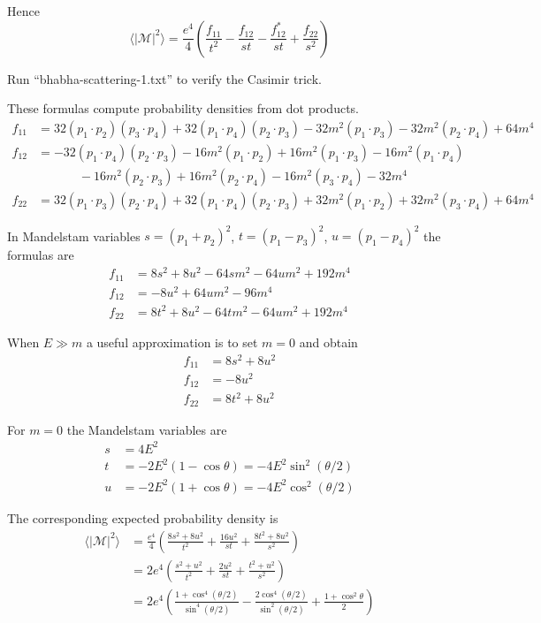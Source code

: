 \documentclass[12pt]{article}
\begin{document}
\noindent
Hence
\begin{equation*}
\langle|\mathcal{M}|^2\rangle
=
\frac{e^4}{4}
\left(
\frac{f_{11}}{t^2} - \frac{f_{12}}{st} -
\frac{f_{12}^*}{st} + \frac{f_{22}}{s^2}
\right)
\end{equation*}

\noindent
Run ``bhabha-scattering-1.txt'' to verify the Casimir trick.

\newpage
\noindent
These formulas compute probability densities from dot products.
\begin{align*}
f_{11}&=
32(p_1\cdot p_2)(p_3\cdot p_4)+32(p_1\cdot p_4)(p_2\cdot p_3)
-32 m^2(p_1\cdot p_3)-32 m^2(p_2\cdot p_4)+64 m^4
\\
f_{12}&=
-32 (p_1\cdot p_4) (p_2\cdot p_3)
-16 m^2 (p_1\cdot p_2) + 16 m^2 (p_1\cdot p_3) - 16 m^2 (p_1\cdot p_4)\\
&\phantom{=}\qquad
{}- 16 m^2 (p_2\cdot p_3) + 16 m^2 (p_2\cdot p_4) - 16 m^2 (p_3\cdot p_4) - 32 m^4
\\
f_{22}&=
32(p_1\cdot p_3)(p_2\cdot p_4)+32(p_1\cdot p_4)(p_2\cdot p_3)
+32 m^2(p_1\cdot p_2)+32 m^2(p_3\cdot p_4)+64 m^4
\end{align*}

\noindent
In Mandelstam variables $s=(p_1+p_2)^2$, $t=(p_1-p_3)^2$, $u=(p_1-p_4)^2$ the formulas are
\begin{align*}
f_{11} &= 8 s^2 + 8 u^2 - 64 s m^2 - 64 u m^2 + 192 m^4
\\
f_{12} &= -8 u^2 + 64 u m^2 - 96 m^4
\\
f_{22} &= 8 t^2 + 8 u^2 - 64 t m^2 - 64 u m^2 + 192 m^4
\end{align*}

\noindent
When $E\gg m$ a useful approximation is to set $m=0$ and obtain
\begin{align*}
f_{11}&= 8 s^2 + 8 u^2\\
f_{12}&= -8 u^2\\
f_{22}&= 8 t^2 + 8 u^2
\end{align*}

\noindent
For $m=0$ the Mandelstam variables are
\begin{align*}
s&=4E^2
\\
t&=-2E^2(1-\cos\theta)=-4E^2\sin^2(\theta/2)
\\
u&=-2E^2(1+\cos\theta)=-4E^2\cos^2(\theta/2)
\end{align*}

\noindent
The corresponding expected probability density is
\begin{align*}
\langle|\mathcal{M}|^2\rangle
&=
\frac{e^4}{4}
\left(
\frac{8s^2+8u^2}{t^2}+\frac{16u^2}{st}+\frac{8t^2+8u^2}{s^2}
\right)
\\
&=2e^4\left(\frac{s^2+u^2}{t^2}+\frac{2u^2}{st}+\frac{t^2+u^2}{s^2}\right)
\\
&=2e^4
\left(
\frac{1+\cos^4(\theta/2)}{\sin^4(\theta/2)}
-\frac{2\cos^4(\theta/2)}{\sin^2(\theta/2)}
+\frac{1+\cos^2\theta}{2}
\right)
\end{align*}
\end{document}
